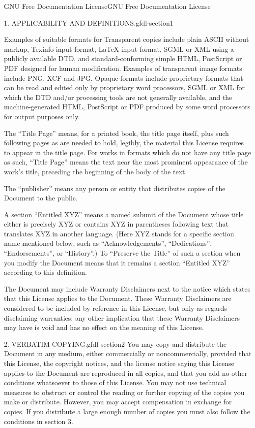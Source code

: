 \documentclass[10pt,]{book}
\numberwithin{equation}{section}
\begin{document}
\begin{appendixptx}{GNU Free Documentation License}{}{GNU Free Documentation License}{}{}
\begin{paragraphs}{1. APPLICABILITY AND DEFINITIONS.}{gfdl-section1}
\par
\hypertarget{p-530}{}%
Examples of suitable formats for Transparent copies include plain ASCII without markup, Texinfo input format, LaTeX input format, SGML or XML using a publicly available DTD, and standard-conforming simple HTML, PostScript or PDF designed for human modification. Examples of transparent image formats include PNG, XCF and JPG. Opaque formats include proprietary formats that can be read and edited only by proprietary word processors, SGML or XML for which the DTD and/or processing tools are not generally available, and the machine-generated HTML, PostScript or PDF produced by some word processors for output purposes only.%
\par
\hypertarget{p-531}{}%
The ``Title Page'' means, for a printed book, the title page itself, plus such following pages as are needed to hold, legibly, the material this License requires to appear in the title page. For works in formats which do not have any title page as such, ``Title Page'' means the text near the most prominent appearance of the work's title, preceding the beginning of the body of the text.%
\par
\hypertarget{p-532}{}%
The ``publisher'' means any person or entity that distributes copies of the Document to the public.%
\par
\hypertarget{p-533}{}%
A section ``Entitled XYZ'' means a named subunit of the Document whose title either is precisely XYZ or contains XYZ in parentheses following text that translates XYZ in another language. (Here XYZ stands for a specific section name mentioned below, such as ``Acknowledgements'', ``Dedications'', ``Endorsements'', or ``History''.) To ``Preserve the Title'' of such a section when you modify the Document means that it remains a section ``Entitled XYZ'' according to this definition.%
\par
\hypertarget{p-534}{}%
The Document may include Warranty Disclaimers next to the notice which states that this License applies to the Document. These Warranty Disclaimers are considered to be included by reference in this License, but only as regards disclaiming warranties: any other implication that these Warranty Disclaimers may have is void and has no effect on the meaning of this License.%
\end{paragraphs}%
\begin{paragraphs}{2. VERBATIM COPYING.}{gfdl-section2}%
\hypertarget{p-535}{}%
You may copy and distribute the Document in any medium, either commercially or noncommercially, provided that this License, the copyright notices, and the license notice saying this License applies to the Document are reproduced in all copies, and that you add no other conditions whatsoever to those of this License. You may not use technical measures to obstruct or control the reading or further copying of the copies you make or distribute. However, you may accept compensation in exchange for copies. If you distribute a large enough number of copies you must also follow the conditions in section 3.%

\end{paragraphs}
\end{appendixptx}
\end{document}
